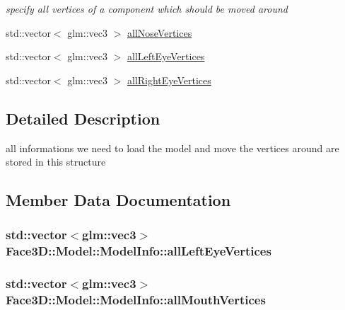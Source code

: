 \begin{DoxyCompactItemize}
\begin{DoxyCompactList}\small\item\em specify all vertices of a component which should be moved around \end{DoxyCompactList}\item 
std\+::vector$<$ glm\+::vec3 $>$ \hyperlink{struct_face3_d_1_1_model_1_1_model_info_a789b548861f05b8bd79f4a3f26b84bbb}{all\+Nose\+Vertices}
\item 
std\+::vector$<$ glm\+::vec3 $>$ \hyperlink{struct_face3_d_1_1_model_1_1_model_info_a8ff9da28559de5ae3a242ce6e18fea75}{all\+Left\+Eye\+Vertices}
\item 
std\+::vector$<$ glm\+::vec3 $>$ \hyperlink{struct_face3_d_1_1_model_1_1_model_info_ab8c6d263cbdc8768344617e03d1e3c24}{all\+Right\+Eye\+Vertices}
\end{DoxyCompactItemize}


\subsection{Detailed Description}
all informations we need to load the model and move the vertices around are stored in this structure 

\subsection{Member Data Documentation}
\subsubsection[{\texorpdfstring{all\+Left\+Eye\+Vertices}{allLeftEyeVertices}}]{\setlength{\rightskip}{0pt plus 5cm}std\+::vector$<$glm\+::vec3$>$ Face3\+D\+::\+Model\+::\+Model\+Info\+::all\+Left\+Eye\+Vertices}\hypertarget{struct_face3_d_1_1_model_1_1_model_info_a8ff9da28559de5ae3a242ce6e18fea75}{}\label{struct_face3_d_1_1_model_1_1_model_info_a8ff9da28559de5ae3a242ce6e18fea75}
\subsubsection[{\texorpdfstring{all\+Mouth\+Vertices}{allMouthVertices}}]{\setlength{\rightskip}{0pt plus 5cm}std\+::vector$<$glm\+::vec3$>$ Face3\+D\+::\+Model\+::\+Model\+Info\+::all\+Mouth\+Vertices}\hypertarget{struct_face3_d_1_1_model_1_1_model_info_a31db594ca5e11d12cb5965c5a6e3ee2d}{}\label{struct_face3_d_1_1_model_1_1_model_info_a31db594ca5e11d12cb5965c5a6e3ee2d}


